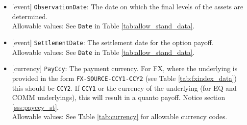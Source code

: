 \begin{itemize}
  \item{}[event] \lstinline!ObservationDate!: The date on which the final levels of the assets are determined. \\
  Allowable values: See \lstinline!Date! in Table \ref{tab:allow_stand_data}.
  \item{}[event] \lstinline!SettlementDate!: The settlement date for the option payoff. \\
  Allowable values: See \lstinline!Date! in Table \ref{tab:allow_stand_data}.
  \item{}[currency] \lstinline!PayCcy!: The payment currency. For FX, where the underlying is provided
      in the form \lstinline!FX-SOURCE-CCY1-CCY2! (see Table \ref{tab:fxindex_data}) this should
      be \lstinline!CCY2!. If \lstinline!CCY1! or the currency of the underlying (for EQ and
      COMM underlyings), this will result in a quanto payoff. Notice section \ref{sss:payccy_st}. \\
        Allowable values: See Table \ref{tab:currency} for allowable currency codes.
\end{itemize}